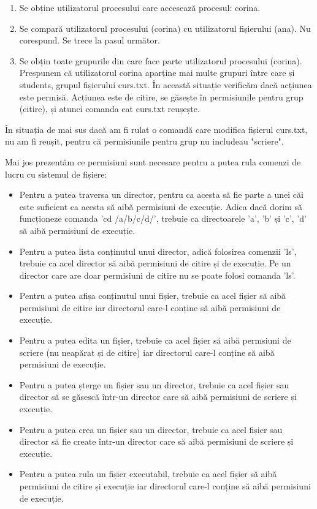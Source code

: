 \begin{enumerate}
	\item Se obține utilizatorul procesului care accesează procesul: corina.
	\item Se compară utilizatorul procesului (corina) cu utilizatorul
		fișierului (ana). Nu corespund. Se trece la pasul următor.
	\item Se obțin toate grupurile din care face parte utilizatorul
		procesului (corina). Prespunem că utilizatorul corina aparține
		mai multe grupuri între care și students, grupul fișierului
		curs.txt. În această situație verificăm dacă acțiunea este
		permisă. Acțiunea este de citire, se găsește în permisiunile
		pentru grup (citire), și atunci comanda cat curs.txt reușește.
\end{enumerate}

În situația de mai sus dacă am fi rulat o comandă care modifica fișierul
curs.txt, nu am fi reușit, pentru că permisiunile pentru grup nu includeau
"scriere".

Mai jos prezentăm ce permisiuni sunt necesare pentru a putea rula comenzi de
lucru cu sistemul de fișiere:

\begin{itemize}
	\item Pentru a putea traversa un director, pentru ca acesta să fie parte
		a unei căi este suficient ca acesta să aibă permisiuni de
		execuție. Adica dacă dorim să funcționeze comanda 'cd
		/a/b/c/d/', trebuie ca directoarele 'a', 'b' și 'c', 'd' să aibă
		permisiuni de execuție.
	\item Pentru a putea lista conținutul unui director, adică folosirea
		comenzii 'ls', trebuie ca acel director să aibă permisiuni de
		citire și de execuție. Pe un director care are doar permisiuni
		de citire nu se poate folosi comanda 'ls'.
	\item Pentru a putea afișa conținutul unui fișier, trebuie ca acel
		fișier să aibă permisiuni de citire iar directorul care-l
		conține să aibă permisiuni de execuție.
	\item Pentru a putea edita un fișier, trebuie ca acel fișier să aibă
		permsiuni de scriere (nu neapărat și de citire) iar directorul
		care-l conține să aibă permisiuni de execuție.
	\item Pentru a putea șterge un fișier sau un director, trebuie ca acel
		fișier sau director să se găsescă într-un director care să aibă
		permisiuni de scriere și execuție.
	\item Pentru a putea crea un fișier sau un director, trebuie ca acel
		fișier sau director să fie create într-un director care să aibă
		permisiuni de scriere și execuție.
	\item Pentru a putea rula un fișier executabil, trebuie ca acel fișier
		să aibă permisiuni de citire și execuție iar directorul care-l
		conține să aibă permisiuni de execuție.
\end{itemize}

